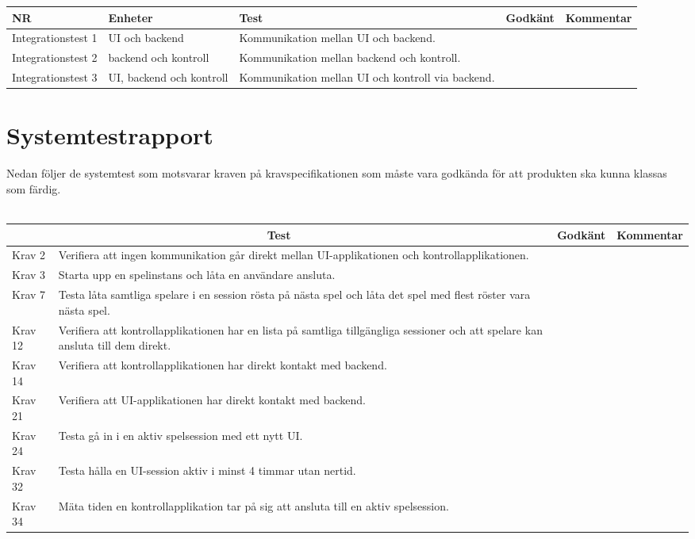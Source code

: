 \documentclass[10pt]{article}
\begin{document}
\noindent
	\begin{tabular}{| p{2.8cm}| p{2cm} | p{5cm}|p{1.2cm}| p{5cm}|}
      		\hline
      		NR&Enheter&Test&Godkänt&Kommentar\\
      		\hline
		Integrationstest 1&UI och backend&Kommunikation mellan UI och backend.&&\\
		\hline
		Integrationstest 2&backend och kontroll&Kommunikation mellan backend och kontroll.&&\\
		\hline
		Integrationstest 3&UI, backend och kontroll&Kommunikation mellan UI och kontroll via backend.&&\\
		\hline
 	 \end{tabular}
 




\section{Systemtestrapport}
Nedan följer de systemtest som motsvarar kraven på kravspecifikationen \cite{bib-kravspec} som måste vara godkända för att produkten ska kunna klassas som färdig.
\\ \\
\noindent
	\begin{tabular}{| p{1.5cm} | p{5cm} | p{1.2cm}| p{7cm}|}
  		\hline
    		\multicolumn{2}{|c|}{Test}&{Godkänt}&{Kommentar}\\
    		\hline
		Krav 2&Verifiera att ingen kommunikation går direkt mellan UI-applikationen och kontrollapplikationen.&&\\
		\hline
		Krav 3&Starta upp en spelinstans och låta en användare ansluta.&& \\
		\hline
		Krav 7& Testa låta samtliga spelare i en session rösta på nästa spel och låta det spel med flest röster vara nästa spel.&&\\
		\hline
		Krav 12& Verifiera att kontrollapplikationen har en lista på samtliga tillgängliga sessioner och att spelare kan ansluta till dem direkt.&& \\
		\hline
		Krav 14& Verifiera att kontrollapplikationen har direkt kontakt med backend.&& \\
		\hline
		Krav 21& Verifiera att UI-applikationen har direkt kontakt med backend.&& \\
		\hline
		Krav 24& Testa gå in i en aktiv spelsession med ett nytt UI.&& \\
		\hline
		Krav 32& Testa hålla en UI-session aktiv i minst 4 timmar utan nertid.&& \\
		\hline
		Krav 34& Mäta tiden en kontrollapplikation tar på sig att ansluta till en aktiv spelsession.&& \\
		\hline   
  	\end{tabular}
\end{document}
